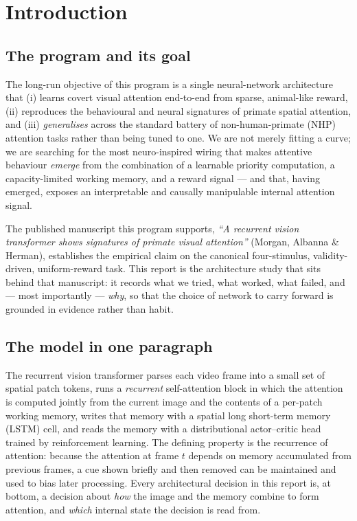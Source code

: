 \chapter{Introduction}
\label{ch:intro}

\section{The program and its goal}
The long-run objective of this program is a single neural-network architecture that (i)
learns covert visual attention end-to-end from sparse, animal-like reward, (ii)
reproduces the behavioural and neural signatures of primate spatial attention, and (iii)
\emph{generalises} across the standard battery of non-human-primate (NHP) attention tasks
rather than being tuned to one. We are not merely fitting a curve; we are searching for
the most neuro-inspired wiring that makes attentive behaviour \emph{emerge} from the
combination of a learnable priority computation, a capacity-limited working memory, and a
reward signal --- and that, having emerged, exposes an interpretable and causally
manipulable internal attention signal.

The published manuscript this program supports, \emph{``A recurrent vision transformer
shows signatures of primate visual attention''} (Morgan, Albanna \& Herman), establishes
the empirical claim on the canonical four-stimulus, validity-driven, uniform-reward task.
This report is the architecture study that sits behind that manuscript: it records what
we tried, what worked, what failed, and --- most importantly --- \emph{why}, so that the
choice of network to carry forward is grounded in evidence rather than habit.

\section{The model in one paragraph}
The recurrent vision transformer parses each video frame into a small set of spatial
patch tokens, runs a \emph{recurrent} self-attention block in which the attention is
computed jointly from the current image and the contents of a per-patch working memory,
writes that memory with a spatial long short-term memory (LSTM) cell, and reads the
memory with a distributional actor--critic head trained by reinforcement learning. The
defining property is the recurrence of attention: because the attention at frame $t$
depends on memory accumulated from previous frames, a cue shown briefly and then removed
can be maintained and used to bias later processing. Every architectural decision in this
report is, at bottom, a decision about \emph{how} the image and the memory combine to form
attention, and \emph{which} internal state the decision is read from.

